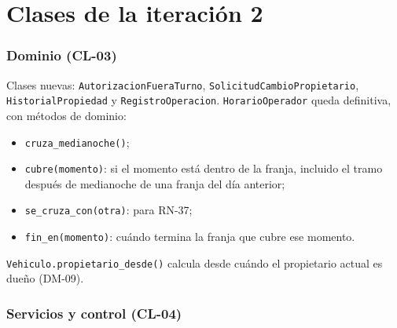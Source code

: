 \section{Clases de la iteración 2}


\subsubsection{Dominio (CL-03)}


Clases nuevas: \texttt{AutorizacionFueraTurno}, \texttt{SolicitudCambioPropietario}, \texttt{HistorialPropiedad} y \texttt{RegistroOperacion}. \texttt{HorarioOperador} queda definitiva, con métodos de dominio:

\begin{itemize}
  \item \texttt{cruza\_medianoche()};
  \item \texttt{cubre(momento)}: si el momento está dentro de la franja, incluido el tramo después de medianoche de una franja del día anterior;
  \item \texttt{se\_cruza\_con(otra)}: para RN-37;
  \item \texttt{fin\_en(momento)}: cuándo termina la franja que cubre ese momento.
\end{itemize}

\texttt{Vehiculo.propietario\_desde()} calcula desde cuándo el propietario actual es dueño (DM-09).


\subsubsection{Servicios y control (CL-04)}



